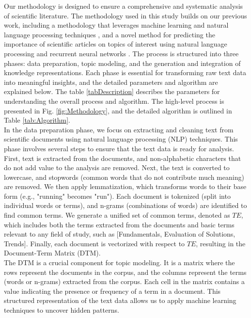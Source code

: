 \documentclass[runningheads]{llncs}
\begin{document}
Our methodology is designed to ensure a comprehensive and systematic analysis of scientific literature. The methodology used in this study builds on our previous work, including a methodology that leverages machine learning and natural language processing techniques \cite{Hurtado2023}, and a novel method for predicting the importance of scientific articles on topics of interest using natural language processing and recurrent neural networks \cite{Lopez2024}. The process is structured into three phases: data preparation, topic modeling, and the generation and integration of knowledge representations. Each phase is essential for transforming raw text data into meaningful insights, and the detailed parameters and algorithm are explained below. The table \ref{tabDescription} describes the parameters for understanding the overall process and algorithm. The high-level process is presented in Fig. \ref{fig:Methodology}, and the detailed algorithm is outlined in Table \ref{tab:Algorithm}.\\ 

In the data preparation phase, we focus on extracting and cleaning text from scientific documents using natural language processing (NLP) techniques. This phase involves several steps to ensure that the text data is ready for analysis. First, text is extracted from the documents, and non-alphabetic characters that do not add value to the analysis are removed. Next, the text is converted to lowercase, and stopwords (common words that do not contribute much meaning) are removed. We then apply lemmatization, which transforms words to their base form (e.g., "running" becomes "run"). Each document is tokenized (split into individual words or terms), and n-grams (combinations of words) are identified to find common terms. We generate a unified set of common terms, denoted as $TE$, which includes both the terms extracted from the documents and basic terms relevant to any field of study, such as [Fundamentals, Evaluation of Solutions, Trends]. Finally, each document is vectorized with respect to $TE$, resulting in the Document-Term Matrix (DTM).\\

The DTM is a crucial component for topic modeling. It is a matrix where the rows represent the documents in the corpus, and the columns represent the terms (words or n-grams) extracted from the corpus. Each cell in the matrix contains a value indicating the presence or frequency of a term in a document. This structured representation of the text data allows us to apply machine learning techniques to uncover hidden patterns.\\
\end{document}
